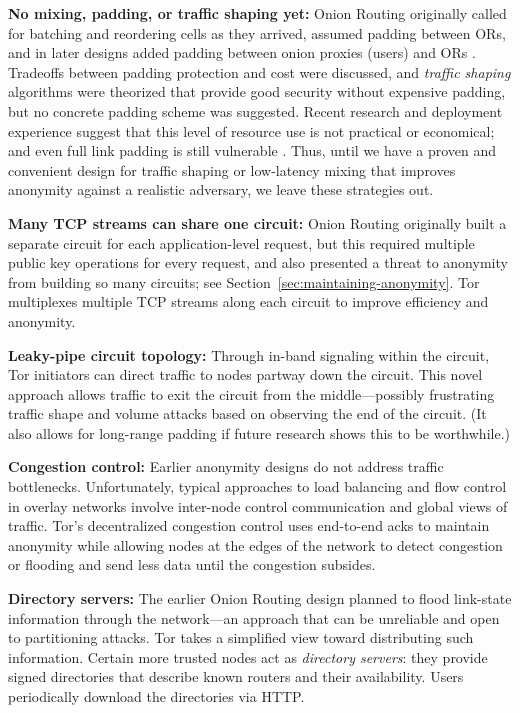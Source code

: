\documentclass[times,10pt,twocolumn]{article}
\begin{document}
\textbf{No mixing, padding, or traffic shaping yet:} Onion
Routing originally called for batching and reordering cells as they arrived,
assumed padding between ORs, and in
later designs added padding between onion proxies (users) and ORs
\cite{or-ih96,or-jsac98}.  Tradeoffs between padding protection
and cost were discussed, and \emph{traffic shaping} algorithms were
theorized \cite{or-pet00} that provide good security without expensive
padding, but no concrete padding scheme was suggested.
Recent research \cite{econymics}
and deployment experience \cite{freedom21-security} suggest that this
level of resource use is not practical or economical; and even full
link padding is still vulnerable \cite{defensive-dropping}. Thus,
until we have a proven and convenient design for traffic shaping or
low-latency mixing that improves anonymity against a realistic
adversary, we leave these strategies out.

\textbf{Many TCP streams can share one circuit:} Onion Routing originally
built a separate circuit for each
application-level request, but this required
multiple public key operations for every request, and also presented
a threat to anonymity from building so many circuits; see
Section~\ref{sec:maintaining-anonymity}.  Tor multiplexes multiple TCP
streams along each circuit to improve efficiency and anonymity.

\textbf{Leaky-pipe circuit topology:} Through in-band signaling
within the circuit, Tor initiators can direct traffic to nodes partway
down the circuit. This novel approach 
allows traffic to exit the circuit from the middle---possibly
frustrating traffic shape and volume attacks based on observing the end
of the circuit. (It also allows for long-range padding if
future research shows this to be worthwhile.)

\textbf{Congestion control:} Earlier anonymity designs do not
address traffic bottlenecks. Unfortunately, typical approaches to
load balancing and flow control in overlay networks involve inter-node
control communication and global views of traffic. Tor's decentralized
congestion control uses end-to-end acks to maintain anonymity
while allowing nodes at the edges of the network to detect congestion
or flooding and send less data until the congestion subsides.

\textbf{Directory servers:} The earlier Onion Routing design
planned to flood link-state information through the network---an approach
that can be unreliable and open to partitioning attacks.
Tor takes a simplified view toward distributing such
information. Certain more trusted nodes act as \emph{directory
servers}: they provide signed directories that describe known
routers and their availability. Users periodically download the
directories via HTTP.
\end{document}
